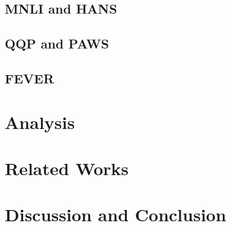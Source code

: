 \documentclass[11pt,a4paper]{article}
\begin{document}
\subsection{MNLI and HANS}


\subsection{QQP and PAWS}
\label{sec:paws}


\subsection{FEVER}
\label{sec:fever}


\section{Analysis}


\section{Related Works}


\section{Discussion and Conclusion}





\appendix
\label{sec:appendix}



\end{document}
